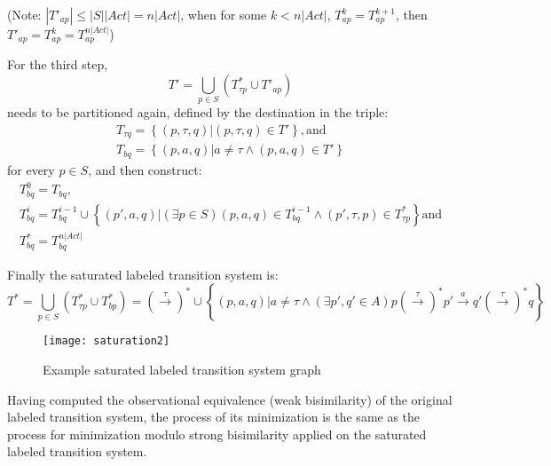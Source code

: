 (Note: $|T'_{ap}|\leq |S||Act|=n|Act|$, when for some $k<n|Act|$, $T^{k}_{ap}=T^{k+1}_{ap}$, then $T'_{ap}=T^{k}_{ap}=T^{n|Act|}_{ap}$)

For the third step, 
\begin{equation*}
	T'=\bigcup_{p\in S}\left(T^{*}_{\tau p}\cup T'_{ap}\right)
\end{equation*}
needs to be partitioned again, defined by the destination in the triple:
\begin{equation*}
	\begin{array}{lcl}
		T_{\tau q}=\left\{\left(p,\tau,q\right)|\left(p,\tau,q\right)\in T'\right\}, \text{and}\\
		T_{bq}=\left\{\left(p,a,q\right)|a\neq\tau\wedge\left(p,a,q\right)\in T'\right\}				    
	\end{array}
\end{equation*}
for every $p\in S$, and then construct:
\begin{equation*}
	\begin{array}{lcl}
		T^{0}_{bq}=T_{bq},\\
		T^{i}_{bq}=T^{i-1}_{bq}\cup\left\{\left(p',a,q\right)|\left(\exists p\in S\right)\left(p,a,q\right)\in T^{i-1}_{bq}\wedge\left(p',\tau,p\right)\in T^{*}_{\tau p}\right\} \text{and}\\
		T^{*}_{bq}=T^{n|Act|}_{bq}
	\end{array}
\end{equation*}

Finally the saturated labeled transition system is:
\begin{equation*}
	T^{*}=\bigcup_{p\in S}\left(T^{*}_{\tau p}\cup T^{*}_{bp}\right)=\left(\stackrel{\tau}{\rightarrow}\right)^{*}\cup\left\{\left(p,a,q\right)|a\neq\tau\wedge\left(\exists p',q'\in A\right) p\left(\stackrel{\tau}{\rightarrow}\right)^{*}p'\stackrel{a}{\rightarrow}q'\left(\stackrel{\tau}{\rightarrow}\right)^{*}q\right\}
\end{equation*}

\begin{figure}[!ht]
\centering
\texttt{[image: saturation2]}
\caption{Example saturated labeled transition system graph}
\label{fig:saturation2}
\end{figure}

Having computed the observational equivalence (weak bisimilarity) of the original labeled transition system, the process of its minimization is the same as the process for minimization modulo strong bisimilarity applied on the saturated labeled transition system.

